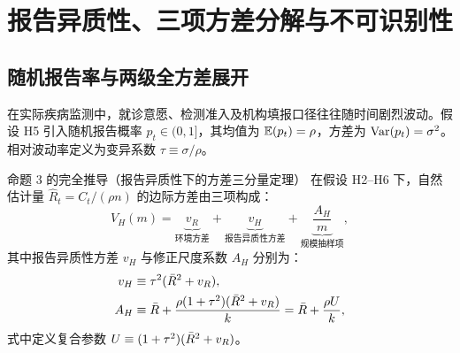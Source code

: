 \section{报告异质性、三项方差分解与不可识别性}
\label{sec:part06}

\subsection{随机报告率与两级全方差展开}

在实际疾病监测中，就诊意愿、检测准入及机构填报口径往往随时间剧烈波动。假设 H5 引入随机报告概率 $p_t \in (0, 1]$，其均值为 $\mathbb{E}(p_t) = \rho$，方差为 $\mathrm{Var}(p_t) = \sigma^2$。相对波动率定义为变异系数 $\tau \equiv \sigma / \rho$。

\begin{theorembox}{命题 3 的完全推导（报告异质性下的方差三分量定理）}
在假设 H2--H6 下，自然估计量 $\widehat{R}_t = C_t / (\rho n)$ 的边际方差由三项构成：
\begin{equation}
  V_H(m) = \underbrace{v_R}_{\text{环境方差}} + \underbrace{v_H}_{\text{报告异质性方差}} + \underbrace{\frac{A_H}{m}}_{\text{规模抽样项}},
  \label{eq:vH-closed}
\end{equation}
其中报告异质性方差 $v_H$ 与修正尺度系数 $A_H$ 分别为：
\begin{align}
  v_H &\equiv \tau^2 (\bar{R}^2 + v_R), \label{eq:vH-def} \\
  A_H &\equiv \bar{R} + \frac{\rho(1+\tau^2)(\bar{R}^2 + v_R)}{k} = \bar{R} + \frac{\rho U}{k}, \label{eq:AH-def}
\end{align}
式中定义复合参数 $U \equiv (1+\tau^2)(\bar{R}^2 + v_R)$。
\end{theorembox}

